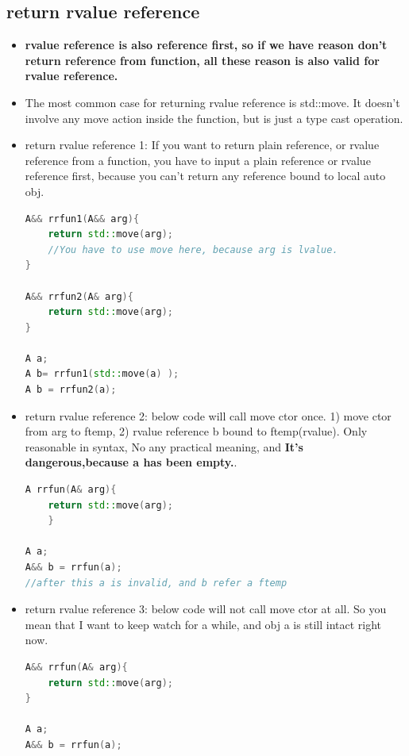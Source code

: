 \documentclass[a4paper,12pt,twoside]{book}
\begin{document}
\subsection{return rvalue reference}
\begin{itemize}
	\item \textbf{rvalue reference is also reference first, so if we have reason don't return reference from function, all these reason is also valid for rvalue reference.}
	
	\item The most common case for returning rvalue reference is std::move. It doesn't involve any move action inside the function, but is just a type cast operation.
	
	\item return rvalue reference 1:   If you want to return plain reference, or rvalue reference from a function, you have to input a plain reference or rvalue reference first, because you can't return any reference bound to local auto obj.
	
\begin{lstlisting}[frame=single, language=c++]
A&& rrfun1(A&& arg){
	return std::move(arg);
	//You have to use move here, because arg is lvalue.
}
	
A&& rrfun2(A& arg){
	return std::move(arg);
}
	
A a;
A b= rrfun1(std::move(a) );
A b = rrfun2(a);
\end{lstlisting}
	
	
	\item return rvalue reference 2:   below code will call move ctor once.  1) move ctor from arg to ftemp, 2) rvalue reference b bound to ftemp(rvalue). Only reasonable in syntax, No any practical meaning, and \textbf{It's dangerous,because a has been empty.}.
\begin{lstlisting}[frame=single, language=c++]
A rrfun(A& arg){
	return std::move(arg);
	}
	
A a;
A&& b = rrfun(a);
//after this a is invalid, and b refer a ftemp
\end{lstlisting}
	

	\item return rvalue reference 3:   below code will not call move ctor at all. So you mean that I want to keep watch for a while, and obj a is still intact right now.
\begin{lstlisting}[frame=single, language=c++]
A&& rrfun(A& arg){
	return std::move(arg);
}
	
A a;
A&& b = rrfun(a);
\end{lstlisting}
	

\end{itemize}
\end{document}
